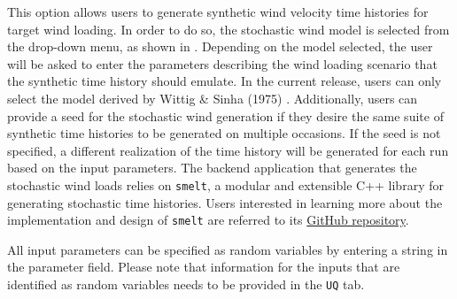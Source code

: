 This option allows users to generate synthetic wind velocity time
histories for target wind loading. In order to do so, the stochastic
wind model is selected from the drop-down menu, as shown in
. Depending on the model selected, the
user will be asked to enter the parameters describing the wind loading
scenario that the synthetic time history should emulate. In the
current release, users can only select the model derived by Wittig \&
Sinha (1975) \cite{wittig1975simulation}. Additionally, users can
provide a seed for the stochastic wind generation if they desire the
same suite of synthetic time histories to be generated on multiple occasions.
If the seed is not specified, a different realization of the time
history will be generated for each run based on the input
parameters. The backend application that generates the stochastic
wind loads relies on \texttt{smelt}, a modular and extensible C++
library for generating stochastic time histories. Users interested in
learning more about the implementation and design of \texttt{smelt}
are referred to its
\href{https://github.com/NHERI-SimCenter/smelt}{GitHub repository}.

All input parameters can be specified as random variables by entering
a string in the parameter field. Please note that information for the
inputs that are identified as random variables needs to be provided in
the \texttt{UQ} tab.


